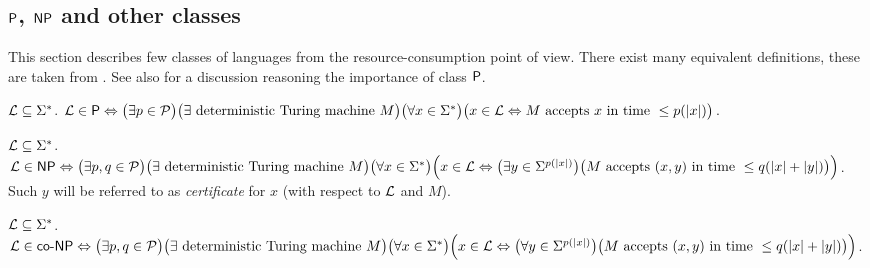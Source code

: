	
	\subsection{$\P$, $\NP$ and other classes}
	\label{sec:PNP}
		
		This section describes few classes of languages from the resource-consumption point of view. There exist many equivalent definitions, these are taken from \cite{book_comp}. See also \cite[Chapter 1.5.1]{book_comp} for a discussion reasoning the importance of class $\P$.
		
		\begin{defn}\label{def:P}
			${\cal L} \subseteq \Sigma^*$. ${\cal L} \in \P \iff \bigl(\exists p \in {\cal P}\bigr) \bigl(\exists \textnormal{ deterministic Turing machine } M\bigr)\\ \bigl(\forall x \in \Sigma^*\bigr) \bigl(x \in {\cal L} \iff M \textnormal{ accepts } x \textnormal{ in time } \leq p(|x|)\bigr)$.
		\end{defn}
		
		\begin{defn}\label{def:NP}
			${\cal L} \subseteq \Sigma^*$. ${\cal L} \in \NP \iff \bigl(\exists p, q \in {\cal P}\bigr) \bigl(\exists \textnormal{ deterministic Turing machine } M\bigr)\\ \bigl(\forall x \in \Sigma^*\bigr) \Bigl(x \in {\cal L} \iff \bigl(\exists y \in \Sigma^{p(|x|)}\bigr) \bigl(M \textnormal{ accepts } (x,y) \textnormal{ in time } \leq q(|x|+|y|)\bigr)\Bigr)$.\\
			Such $y$ will be referred to as {\em certificate} for $x$ (with respect to $\cal L$ and $M$).
		\end{defn}
		
		\begin{defn}\label{def:coNP}
			${\cal L} \subseteq \Sigma^*$. ${\cal L} \in \coNP \iff \bigl(\exists p, q \in {\cal P}\bigr) \bigl(\exists \textnormal{ deterministic Turing machine } M\bigr)\\ \bigl(\forall x \in \Sigma^*\bigr) \Bigl(x \in {\cal L} \iff \bigl(\forall y \in \Sigma^{p(|x|)}\bigr) \bigl(M \textnormal{ accepts } (x,y) \textnormal{ in time } \leq q(|x|+|y|)\bigr)\Bigr)$.
		\end{defn}
		
